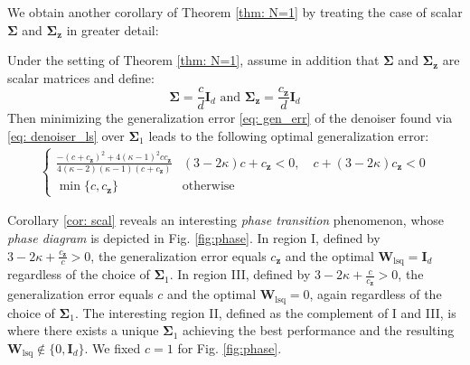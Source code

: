 \documentclass[final]{l4dc2026}
\newcommand{\bSigma}{\bm{\Sigma}}
\newcommand{\bI}{\mathbf{I}}
\newcommand{\bW}{\mathbf{W}}
\newcommand{\bz}{\mathbf{z}}
\newcommand{\bzero}{\mathbf{0}}
\begin{document}
We obtain another corollary of Theorem \ref{thm: N=1} by treating the case of scalar $\bSigma$ and $\bSigma_\bz$ in greater detail:
\begin{corollary}\label{cor: scal}
    Under the setting of Theorem \ref{thm: N=1}, assume in addition that $\bSigma$ and $\bSigma_\bz$ are scalar matrices and define:
    $$\bSigma = \frac{c}{d}\bI_d \text{ and } \bSigma_\bz = \frac{c_\bz}{d}\bI_d $$
    Then minimizing the generalization error \eqref{eq: gen_err} of the denoiser found via \eqref{eq: denoiser_ls} over $\bSigma_1$ leads to the following optimal generalization error:  
    \begin{align} \label{eq: opt_scal}
    \begin{cases}
        \frac{-(c+ c_{\bz})^2 +  4(\kappa-1)^2 c c_{\bz}}{4 (\kappa-2) (\kappa-1) ( c + c_{\bz}) }  & (3-2\kappa) c + c_{\bz} < 0 , \quad c + (3 - 2\kappa) c_{\bz} < 0 \\
        \min\{c, c_{\bz}\} & \text{otherwise}
    \end{cases} 
\end{align}
\end{corollary}
\begin{remark}\label{rem: pht}
Corollary \ref{cor: scal} reveals an interesting \textit{phase transition} phenomenon, whose \textit{phase diagram} is depicted in Fig. \ref{fig:phase}. In region I, defined by $3-2\kappa + \frac{c_\bz}{c} > 0$, the generalization error equals  $c_{\bz}$ and the optimal $\bW_{\text{lsq}} = \bI_d$ regardless of the choice of $\bSigma_1$. In region III, defined by $3-2\kappa + \frac{c}{c_\bz} > 0$, the generalization error equals $c$ and the optimal $\bW_{\text{lsq}} = 0$, again regardless of the choice of $\bSigma_1$. The interesting region II,  defined as the complement of I and III, is where there exists a unique  $\bSigma_1$ achieving the best performance and the resulting $\bW_{\text{lsq}} \notin \{0, \bI_d\}$. We fixed $c=1$ for Fig. \ref{fig:phase}.
\end{remark}
\end{document}
